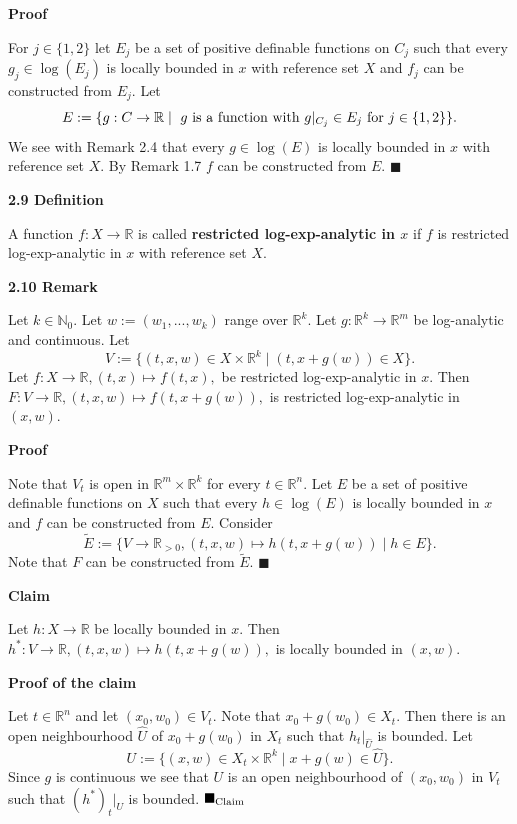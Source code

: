 \documentclass[12pt]{article}
\def\vs{\vspace}
\begin{document}
\vs{0.4cm}
{\bf Proof}

\vs{0.1cm}
For $j \in \{1,2\}$ let $E_j$ be a set of positive definable functions on $C_j$ such that every $g_j \in \log(E_j)$ is locally bounded in $x$ with reference set $X$ and $f_j$ can be constructed from $E_j$. Let
$$E:=\{g:C \to \mathbb{R} \mid \textnormal{ $g$ is a function with } g|_{C_j} \in E_j \textnormal{ for } j \in \{1,2\}\}.$$
We see with Remark 2.4 that every $g \in \log(E)$ is locally bounded in $x$ with reference set $X$. By Remark 1.7 $f$ can be constructed from $E$. \hfill$\blacksquare$

\vs{0.5cm}
{\bf2.9 Definition}

\vs{0.1cm}
A function $f:X \to \mathbb{R}$ is called \textbf{restricted log-exp-analytic in $x$} if $f$ is restricted log-exp-analytic in $x$ with reference set $X$.

\vs{0.5cm}
{\bf2.10 Remark}

\vs{0.1cm}
Let $k \in \mathbb{N}_0$. Let $w:=(w_1,...,w_k)$ range over $\mathbb{R}^k$. Let $g:\mathbb{R}^k \to \mathbb{R}^m$ be log-analytic and continuous. Let
$$V:=\{(t,x,w) \in X \times \mathbb{R}^k \mid (t,x+g(w)) \in X\}.$$
Let $f:X \to \mathbb{R}, (t,x) \mapsto f(t,x),$ be restricted log-exp-analytic in $x$. 
Then $F:V \to \mathbb{R}, (t,x,w) \mapsto f(t,x+g(w)),$ is restricted log-exp-analytic in $(x,w)$. %

\vs{0.4cm}
{\bf Proof}

\vs{0.1cm}
Note that $V_t$ is open in $\mathbb{R}^m \times \mathbb{R}^k$ for every $t \in \mathbb{R}^n$. Let $E$ be a set of positive definable functions on $X$ such that every $h \in \log(E)$ is locally bounded in $x$ and $f$ can be constructed from $E$. Consider
$$\tilde{E}:=\{V \to \mathbb{R}_{>0}, (t,x,w) \mapsto h(t,x+g(w)) \mid h \in E\}.$$  
Note that $F$ can be constructed from $\tilde{E}$. \hfill$\blacksquare$ 

\vs{0.4cm}
{\bf Claim}

\vs{0.1cm}
Let $h:X \to \mathbb{R}$ be locally bounded in $x$. Then $h^*:V \to \mathbb{R},(t,x,w) \mapsto h(t,x+g(w)),$ is locally bounded in $(x,w)$.

\vs{0.4cm}
{\bf Proof of the claim}

\vs{0.1cm}
Let $t \in \mathbb{R}^n$ and let $(x_0,w_0) \in V_t$. Note that $x_0+g(w_0) \in X_t$. Then there is an open neighbourhood $\hat{U}$ of $x_0+g(w_0)$ in $X_t$ such that $h_t|_{\hat{U}}$ is bounded. Let  
$$U:=\{(x,w) \in X_t \times \mathbb{R}^k \mid x+g(w) \in \hat{U}\}.$$
Since $g$ is continuous we see that $U$ is an open neighbourhood of $(x_0,w_0)$ in $V_t$ such that $(h^*)_t|_U$ is bounded.
\hfill$\blacksquare_{\textnormal{Claim}}$
\end{document}
